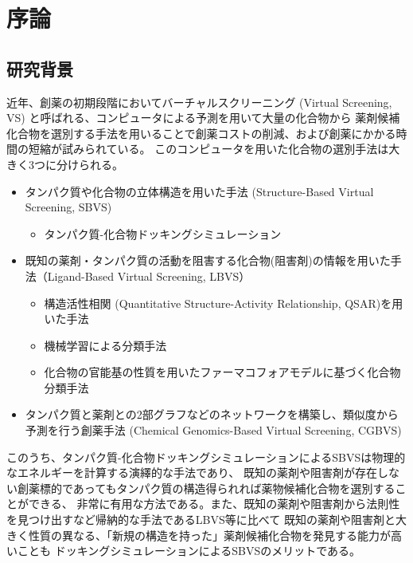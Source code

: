 \chapter{序論}
\section{研究背景}\label{sec:background}
近年、創薬の初期段階においてバーチャルスクリーニング (Virtual Screening, VS) と呼ばれる、コンピュータによる予測を用いて大量の化合物から
薬剤候補化合物を選別する手法を用いることで創薬コストの削減、および創薬にかかる時間の短縮が試みられている。
このコンピュータを用いた化合物の選別手法は大きく3つに分けられる。

\begin{itemize}
\item タンパク質や化合物の立体構造を用いた手法 (Structure-Based Virtual Screening, SBVS)
	\begin{itemize}
	\item タンパク質-化合物ドッキングシミュレーション\cite{Friesner2004, Zsoldos2007, Morris2009}
	\end{itemize}
\item 既知の薬剤・タンパク質の活動を阻害する化合物(阻害剤)の情報を用いた手法（Ligand-Based Virtual Screening, LBVS）
	\begin{itemize}
	\item 構造活性相関 (Quantitative Structure-Activity Relationship, QSAR)を用いた手法\cite{Hansch1964}
	\item 機械学習による分類手法\cite{Ivanciuc2007}
	\item 化合物の官能基の性質を用いたファーマコフォアモデルに基づく化合物分類手法\cite{Wolber2008}
	\end{itemize}
\item タンパク質と薬剤との2部グラフなどのネットワークを構築し、類似度から予測を行う創薬手法 
	(Chemical Genomics-Based Virtual Screening, CGBVS)\cite{Brown2012}
\end{itemize}

このうち、タンパク質-化合物ドッキングシミュレーションによるSBVSは物理的なエネルギーを計算する演繹的な手法であり、
既知の薬剤や阻害剤が存在しない創薬標的であってもタンパク質の構造得られれば薬物候補化合物を選別することができる、
非常に有用な方法である。また、既知の薬剤や阻害剤から法則性を見つけ出すなど帰納的な手法であるLBVS等に比べて
既知の薬剤や阻害剤と大きく性質の異なる、「新規の構造を持った」薬剤候補化合物を発見する能力が高いことも
ドッキングシミュレーションによるSBVSのメリットである。

